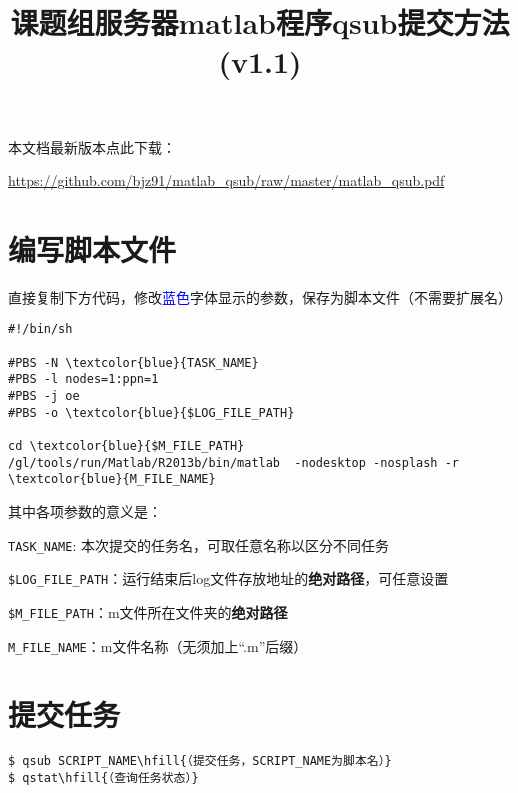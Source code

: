 \documentclass{ctexart}
\title{\bf 课题组服务器matlab程序qsub提交方法 (v1.1)}
\author{}
\date{}
\begin{document}
\maketitle 

\thispagestyle{empty}

\vspace{-0.5in}

本文档最新版本点此下载：

\url{https://github.com/bjz91/matlab_qsub/raw/master/matlab_qsub.pdf}

\section{编写脚本文件}
直接复制下方代码，修改\textcolor{blue}{蓝色}字体显示的参数，保存为脚本文件（不需要扩展名）
\begin{Verbatim}[frame=single,framesep=1mm,baselinestretch=0.8,commandchars=\\\{\}]
#!/bin/sh

#PBS -N \textcolor{blue}{TASK_NAME}
#PBS -l nodes=1:ppn=1
#PBS -j oe
#PBS -o \textcolor{blue}{$LOG_FILE_PATH}

cd \textcolor{blue}{$M_FILE_PATH}
/gl/tools/run/Matlab/R2013b/bin/matlab  -nodesktop -nosplash -r \textcolor{blue}{M_FILE_NAME}
\end{Verbatim}

其中各项参数的意义是：
\begin{itemize*}
\item \texttt{TASK\_NAME}: 本次提交的任务名，可取任意名称以区分不同任务
\item \texttt{\$LOG\_FILE\_PATH}：运行结束后log文件存放地址的\textbf{绝对路径}，可任意设置
\item \texttt{\$M\_FILE\_PATH}：m文件所在文件夹的\textbf{绝对路径}
\item \texttt{M\_FILE\_NAME}：m文件名称（无须加上``.m''后缀）
\end{itemize*}

\section{提交任务}
\begin{Verbatim}[frame=single,framesep=1mm,baselinestretch=0.8,commandchars=\\\{\}]
$ qsub SCRIPT_NAME\hfill{（提交任务，SCRIPT_NAME为脚本名）}
$ qstat\hfill{（查询任务状态）}
\end{Verbatim}
\end{document}
